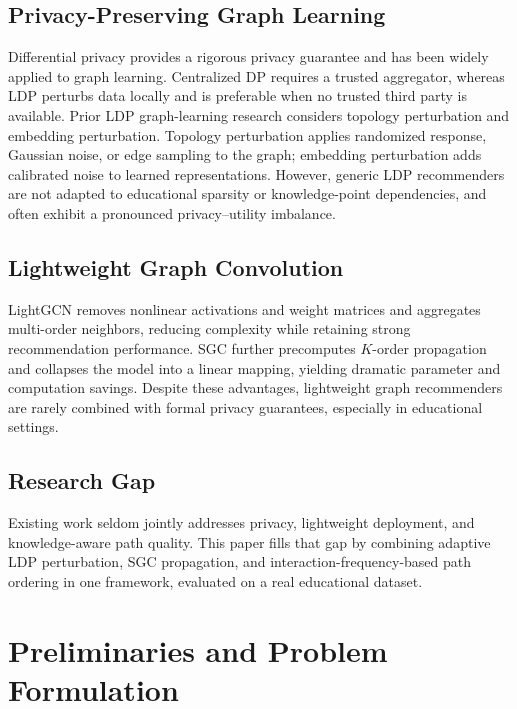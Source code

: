 \documentclass[sn-mathphys]{sn-jnl}
\begin{document}
\subsection{Privacy-Preserving Graph Learning}
Differential privacy provides a rigorous privacy guarantee and has been widely applied to graph learning. Centralized DP requires a trusted aggregator, whereas LDP perturbs data locally and is preferable when no trusted third party is available. Prior LDP graph-learning research considers topology perturbation and embedding perturbation. Topology perturbation applies randomized response, Gaussian noise, or edge sampling to the graph; embedding perturbation adds calibrated noise to learned representations. However, generic LDP recommenders are not adapted to educational sparsity or knowledge-point dependencies, and often exhibit a pronounced privacy--utility imbalance.

\subsection{Lightweight Graph Convolution}
LightGCN removes nonlinear activations and weight matrices and aggregates multi-order neighbors, reducing complexity while retaining strong recommendation performance. SGC further precomputes $K$-order propagation and collapses the model into a linear mapping, yielding dramatic parameter and computation savings. Despite these advantages, lightweight graph recommenders are rarely combined with formal privacy guarantees, especially in educational settings.

\subsection{Research Gap}
Existing work seldom jointly addresses privacy, lightweight deployment, and knowledge-aware path quality. This paper fills that gap by combining adaptive LDP perturbation, SGC propagation, and interaction-frequency-based path ordering in one framework, evaluated on a real educational dataset.

\section{Preliminaries and Problem Formulation}
\label{sec:prelim}
\end{document}
